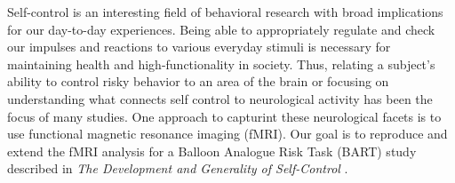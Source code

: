 \par Self-control is an interesting field of behavioral research with broad 
implications for our day-to-day experiences. Being able to appropriately 
regulate and check our impulses and reactions to various everyday stimuli 
is necessary for maintaining health and high-functionality in society. 
Thus, relating a subject’s ability to control risky behavior to an area 
of the brain or focusing on understanding what connects self control to 
neurological activity has been the focus of many studies. One approach to 
capturint these neurological facets is to use functional magnetic resonance 
imaging (fMRI).  Our goal is to reproduce and extend the fMRI analysis for a 
Balloon Analogue Risk Task (BART) study described in \textit{The Development 
and Generality of Self-Control} \cite{CohenSelfControl}.
